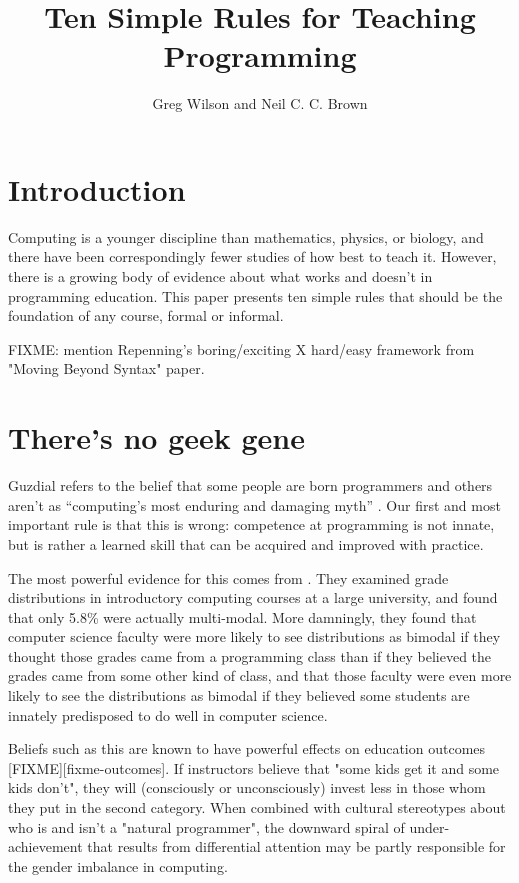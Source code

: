 \documentclass{article}
\begin{document}
\title{Ten Simple Rules for Teaching Programming}

\author{Greg Wilson and Neil C. C. Brown}


\maketitle

\section*{Introduction}

Computing is a younger discipline than mathematics, physics, or biology,
and there have been correspondingly fewer studies of how best to teach it.
However,
there is a growing body of evidence about what works and doesn't in programming education.
This paper presents ten simple rules that should be the foundation of any course,
formal or informal.

FIXME: mention Repenning's boring/exciting X hard/easy framework from "Moving Beyond Syntax" paper.

\section{There's no geek gene} %

Guzdial refers to the belief that some people are born programmers and others aren't
as ``computing's most enduring and damaging myth'' \citep{guzdial-myths}.
Our first and most important rule is that this is wrong:
competence at programming is not innate,
but is rather a learned skill that can be acquired and improved with practice.

The most powerful evidence for this comes from \citet{patitsas-bimodal}.
They examined grade distributions in introductory computing courses at a large university,
and found that only 5.8\% were actually multi-modal.
More damningly,
they found that computer science faculty were more likely to see distributions as bimodal
if they thought those grades came from a programming class
than if they believed the grades came from some other kind of class,
and that those faculty were even more likely to see the distributions as bimodal
if they believed some students are innately predisposed to do well in computer science.

Beliefs such as this are known to have powerful effects on education outcomes [FIXME][fixme-outcomes].
If instructors believe that "some kids get it and some kids don't",
they will (consciously or unconsciously) invest less in those whom they put in the second category.
When combined with cultural stereotypes about who is and isn't a "natural programmer",
the downward spiral of under-achievement that results from differential attention
may be partly responsible for the gender imbalance in computing.
\end{document}
